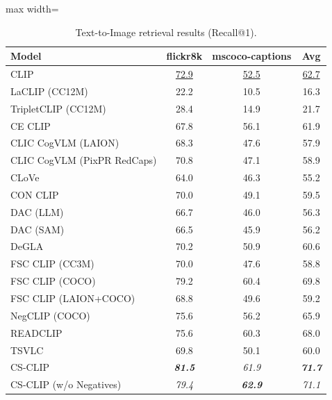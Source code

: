 \begin{table}[t]
  \centering
  \scriptsize
  \caption{Text-to-Image retrieval results (Recall@1).}
  \label{tab:retrieval_t2i}
  \begin{adjustbox}{max width=\textwidth}
  \setlength{\tabcolsep}{3pt}
  \begin{tabular}{lccc}
    \toprule
    Model & flickr8k & mscoco-captions & Avg \\
    \midrule
    CLIP & \underline{72.9} & \underline{52.5} & \underline{62.7} \\
    \midrule
    LaCLIP (CC12M) & 22.2 & 10.5 & 16.3 \\
    TripletCLIP (CC12M) & 28.4 & 14.9 & 21.7 \\
    \midrule
    CE CLIP & 67.8 & 56.1 & 61.9 \\
    CLIC CogVLM (LAION) & 68.3 & 47.6 & 57.9 \\
    CLIC CogVLM (PixPR RedCaps) & 70.8 & 47.1 & 58.9 \\
    CLoVe & 64.0 & 46.3 & 55.2 \\
    CON CLIP & 70.0 & 49.1 & 59.5 \\
    DAC (LLM) & 66.7 & 46.0 & 56.3 \\
    DAC (SAM) & 66.5 & 45.9 & 56.2 \\
    DeGLA & 70.2 & 50.9 & 60.6 \\
    FSC CLIP (CC3M) & 70.0 & 47.6 & 58.8 \\
    FSC CLIP (COCO) & 79.2 & 60.4 & 69.8 \\
    FSC CLIP (LAION+COCO) & 68.8 & 49.6 & 59.2 \\
    NegCLIP (COCO) & 75.6 & 56.2 & 65.9 \\
    READCLIP & 75.6 & 60.3 & 68.0 \\
    TSVLC & 69.8 & 50.1 & 60.0 \\
    \midrule
    CS-CLIP & \emph{\textbf{81.5}} & \emph{61.9} & \emph{\textbf{71.7}} \\
    CS-CLIP (w/o Negatives) & \emph{79.4} & \emph{\textbf{62.9}} & \emph{71.1} \\
    \bottomrule
  \end{tabular}
  \end{adjustbox}
\end{table}
